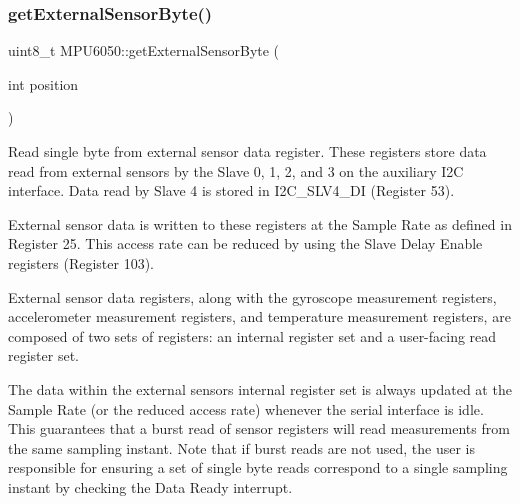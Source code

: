 \begin{DoxyCode}{0}

\end{DoxyCode}
\mbox{\label{classMPU6050_a7f786ab4264f40e5a95e8937ec9adcc2}} 
\subsubsection{\texorpdfstring{getExternalSensorByte()}{getExternalSensorByte()}}
{\footnotesize\ttfamily uint8\+\_\+t M\+P\+U6050\+::get\+External\+Sensor\+Byte (\begin{DoxyParamCaption}\item[{int}]{position }\end{DoxyParamCaption})}

Read single byte from external sensor data register. These registers store data read from external sensors by the Slave 0, 1, 2, and 3 on the auxiliary I2C interface. Data read by Slave 4 is stored in I2\+C\+\_\+\+S\+L\+V4\+\_\+\+DI (Register 53).

External sensor data is written to these registers at the Sample Rate as defined in Register 25. This access rate can be reduced by using the Slave Delay Enable registers (Register 103).

External sensor data registers, along with the gyroscope measurement registers, accelerometer measurement registers, and temperature measurement registers, are composed of two sets of registers\+: an internal register set and a user-\/facing read register set.

The data within the external sensors\textquotesingle{} internal register set is always updated at the Sample Rate (or the reduced access rate) whenever the serial interface is idle. This guarantees that a burst read of sensor registers will read measurements from the same sampling instant. Note that if burst reads are not used, the user is responsible for ensuring a set of single byte reads correspond to a single sampling instant by checking the Data Ready interrupt.

